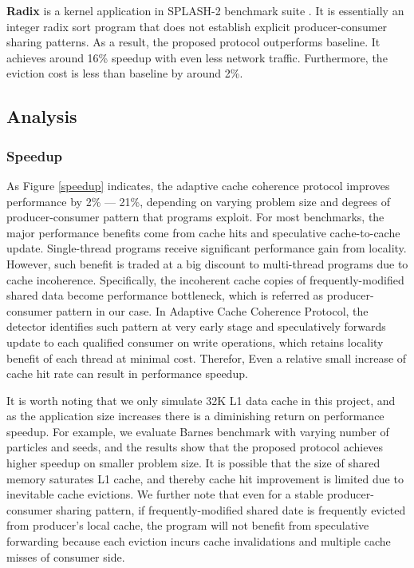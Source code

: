 \documentclass[11pt,conference]{IEEEtran}
\begin{document}
\textbf{Radix} is a kernel application in SPLASH-2 benchmark suite \cite{splash}. It is essentially an integer radix sort program that does not establish explicit producer-consumer sharing patterns. As a result, the proposed protocol outperforms baseline. It achieves around 16\% speedup with even less network traffic. Furthermore, the eviction cost is less than baseline by around 2\%.


\subsection{Analysis}

\subsubsection{Speedup}
As Figure \ref{speedup} indicates, the adaptive cache coherence protocol improves performance by 2\% --- 21\%, depending on varying problem size and degrees of producer-consumer pattern that programs exploit. For most benchmarks, the major performance benefits come from cache hits and speculative cache-to-cache update. Single-thread programs receive significant performance gain from locality. However, such benefit is traded at a big discount to multi-thread programs due to cache incoherence. Specifically, the incoherent cache copies of frequently-modified shared data become performance bottleneck, which is referred as producer-consumer pattern in our case. In Adaptive Cache Coherence Protocol, the detector identifies such pattern at very early stage and speculatively forwards update to each qualified consumer on write operations, which retains locality benefit of each thread at minimal cost. Therefor, Even a relative small increase of cache hit rate can result in performance speedup.

It is worth noting that we only simulate 32K L1 data cache in this project, and as the application size increases there is a diminishing return on performance speedup. For example, we evaluate Barnes benchmark with varying number of particles and seeds, and the results show that the proposed protocol achieves higher speedup on smaller problem size. It is possible that the size of shared memory saturates L1 cache, and thereby cache hit improvement is limited due to inevitable cache evictions. We further note that even for a stable producer-consumer sharing pattern, if frequently-modified shared date is frequently evicted from producer's local cache, the program will not benefit from speculative forwarding because each eviction incurs cache invalidations and multiple cache misses of consumer side.
\end{document}

